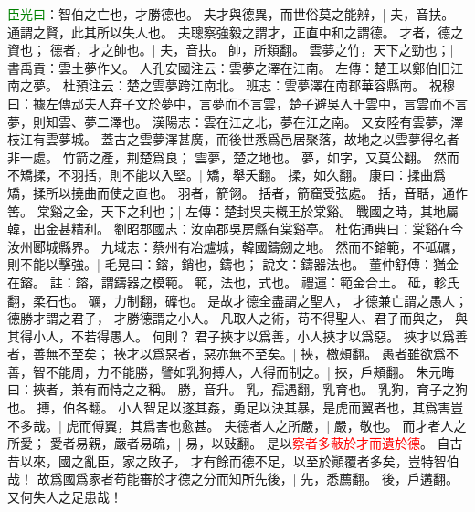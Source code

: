 \textcolor{green}{臣光曰}：智伯之亡也，才勝德也。
夫才與德異，而世俗莫之能辨，|{
	夫，音扶。
	}
通謂之賢，此其所以失人也。%
夫聰察強毅之謂才，正直中和之謂德。
才者，德之資也；
德者，才之帥也。|{
	夫，音扶。
	帥，所類翻。
	}
雲夢之竹，天下之勁也；|{
	書禹貢：雲土夢作乂。
	人孔安國注云：雲夢之澤在江南。
	左傳：楚王以鄭伯旧江南之夢。
	杜預注云：楚之雲夢跨江南北。
	班志：雲夢澤在南郡華容縣南。
	祝穆曰：據左傳䢵夫人弃子文於夢中，言夢而不言雲，楚子避吳入于雲中，言雲而不言夢，則知雲、夢二澤也。
	漢陽志：雲在江之北，夢在江之南。
	又安陸有雲夢，澤枝江有雲夢城。
	蓋古之雲夢澤甚廣，而後世悉爲邑居聚落，故地之以雲夢得名者非一處。
	竹箭之產，荆楚爲良；
	雲夢，楚之地也。
	夢，如字，又莫公翻。
	}
然而不矯揉，不羽括，則不能以入堅。|{
	矯，舉夭翻。
	揉，如久翻。
	康曰：揉曲爲矯，揉所以撓曲而使之直也。
	羽者，箭翎。
	括者，箭窟受弦處。
	括，音聒，通作筈。
	}
棠谿之金，天下之利也；|{
	左傳：楚封吳夫槪王於棠谿。
	戰國之時，其地屬韓，出金甚精利。
	劉昭郡國志：汝南郡吳房縣有棠谿亭。
	杜佑通典曰：棠谿在今汝州郾城縣界。
	九域志：蔡州有冶爐城，韓國鑄劒之地。
	}
然而不鎔範，不砥礪，則不能以擊強。|{
	毛晃曰：鎔，銷也，鑄也；
	說文：鑄器法也。
	董仲舒傳：猶金在鎔。
	註：鎔，謂鑄器之模範。
	範，法也，式也。
	禮運：範金合土。
	砥，軫氏翻，柔石也。
	礪，力制翻，䃺也。
	}
是故才德全盡謂之聖人，
才德兼亡謂之愚人；
德勝才謂之君子，
才勝德謂之小人。
凡取人之術，苟不得聖人、君子而與之，
與其得小人，不若得愚人。%
何則？
君子挾才以爲善，小人挾才以爲惡。
挾才以爲善者，善無不至矣；
挾才以爲惡者，惡亦無不至矣。|{
	挾，檄頰翻。
	}
愚者雖欲爲不善，智不能周，力不能勝，譬如乳狗搏人，人得而制之。|{
	挾，戶頰翻。
	朱元晦曰：挾者，兼有而恃之之稱。
	勝，音升。
	乳，孺遇翻，乳育也。
	乳狗，育子之狗也。
	搏，伯各翻。}
小人智足以遂其姦，勇足以決其暴，是虎而翼者也，其爲害豈不多哉。|{
	虎而傅翼，其爲害也愈甚。
	}
夫德者人之所嚴，|{
	嚴，敬也。
	}
而才者人之所愛；
愛者易親，嚴者易疏，|{
	易，以䜴翻。
	}
是以\textcolor{red}{察者多蔽於才而遺於德}。
自古昔以來，國之亂臣，家之敗子，
才有餘而德不足，以至於顚覆者多矣，豈特智伯哉！
故爲國爲家者苟能審於才德之分而知所先後，|{
	先，悉薦翻。
	後，戶遘翻。
	}
又何失人之足患哉！


